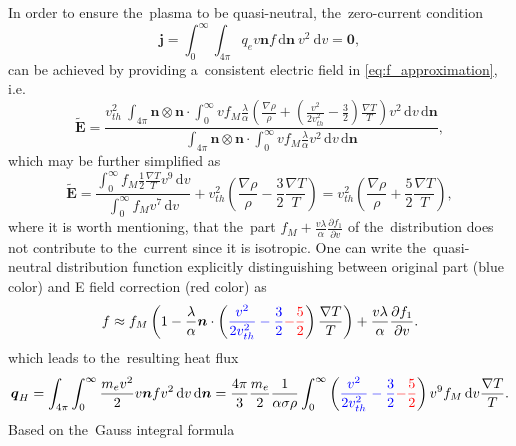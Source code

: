 \documentclass[preprint,12pt]{elsarticle}
\newcommand{\pdv}[2]{\frac{\partial{#1}}{\partial{#2}}}
\newcommand{\vect}[1]{\boldsymbol{#1}}
\newcommand{\dI}{\text{d}}
\newcommand{\mfp}{\lambda}
\newcommand{\vmag}{v}
\newcommand{\vth}{v_{th}}
\newcommand{\vn}{\vect{n}}
\newcommand{\tE}{\vect{\tilde{E}}}
\newcommand{\qe}{q_e}
\newcommand{\me}{m_e}
\newcommand{\crs}{\sigma}
\newcommand{\fM}{f_M}
\newcounter{bla}
\begin{document}
In order to ensure the~plasma to be quasi-neutral, the~zero-current condition
\begin{equation}
  \vect{j} = \int_0^{\infty}\int_{4\pi} \qe \vmag \vn f 
  \, \dI\vn~\vmag^2~\dI\vmag 
  = \vect{0} ,
  \label{eq:zero_current}
\end{equation}
can be achieved by providing a~consistent electric field in 
\eqref{eq:f_approximation}, i.e.
\begin{equation}
  \tE = \frac{\vth^2~\int_{4\pi} \vn\otimes\vn\cdot \int_0^{\infty} \vmag  
  \fM \frac{\mfp}{\alpha}\left(\frac{\nabla\rho}{\rho} + 
  \left( \frac{\vmag^2}{2 \vth^2} - \frac{3}{2}\right) 
  \frac{\nabla T}{T}\right)
  \vmag^2\, \dI\vmag\, \dI\vn}
  {\int_{4\pi} \vn\otimes\vn\cdot \int_0^{\infty} \vmag  
  \fM \frac{\mfp}{\alpha}\vmag^2\, \dI\vmag\, \dI\vn} ,
\end{equation}
which may be further simplified as
\begin{equation}
  \tE = \frac{\int_0^{\infty} \fM
  \frac{1}{2}\frac{\nabla T}{T}\vmag^9\, \dI\vmag}
  {\int_0^{\infty} \fM \vmag^7\, \dI\vmag} + 
  \vth^2\left(\frac{\nabla\rho}{\rho} - \frac{3}{2}\frac{\nabla T}{T} \right)
  = \vth^2\left(\frac{\nabla\rho}{\rho} + \frac{5}{2}\frac{\nabla T}{T} 
  \right) ,
\end{equation}
where it is worth mentioning, that the~part 
$\fM + \frac{\vmag\mfp}{\alpha} \pdv{f_1}{\vmag}$ of the~distribution
does not contribute to the~current since it is isotropic.
One can write the~quasi-neutral distribution function explicitly 
distinguishing between original part (blue color) and E field correction
(red color) as
\begin{equation}
  f \approx \fM \left(1 - \frac{\mfp}{\alpha}\vn\cdot\left( 
  \textcolor{blue}{
  \frac{\vmag^2}{2 \vth^2} - \frac{3}{2}
  }
  \textcolor{red}{
  - \frac{5}{2}
  }
  \right) \frac{\nabla T}{T} \right) 
  + \frac{\vmag\mfp}{\alpha} \pdv{f_1}{\vmag} .
  \label{eq:f_localized_quasineutral}
\end{equation}
which leads to the~resulting heat flux
\begin{equation}
  \vect{q}_H = \int_{4\pi}\int_0^{\infty} \frac{\me \vmag^2}{2} \vmag \vn f 
  \vmag^2\, \dI\vmag\, \dI\vn = \frac{4\pi}{3}\frac{\me}{2}
  \frac{1}{\alpha \crs\rho}
  \int_0^{\infty} \left( 
  \textcolor{blue}{
  \frac{\vmag^2}{2 \vth^2} - \frac{3}{2}
  }
  \textcolor{red}{
  - \frac{5}{2}
  }
  \right) \vmag^9 \fM\, \dI\vmag \frac{\nabla T}{T} .
  \nonumber
\end{equation} 
Based on the~Gauss integral formula
\end{document}
